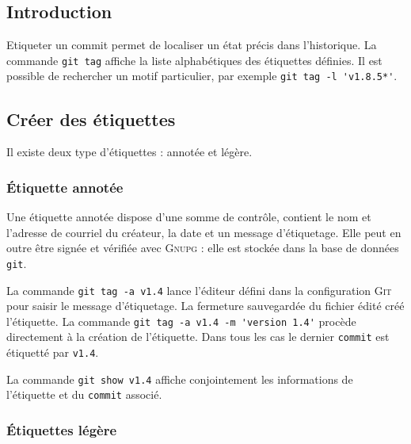 \documentclass[11pt,twoside,headings=normal,open=right,french,DIV=12]{scrreprt}
\newcommand{\git}{\textsc{Git}}
\newcommand{\spec}[1]{\texttt{#1}}
\begin{document}
\subsection{Introduction}



    Etiqueter un commit permet de localiser un état précis dans l'historique. La commande \verb|git tag| affiche la liste
    alphabétiques des étiquettes définies. Il est possible de rechercher un motif particulier, par exemple
    \verb|git tag -l 'v1.8.5*'|.



\subsection{Créer des étiquettes}    



    Il existe deux type d'étiquettes : annotée et légère.



\subsubsection{\'Etiquette annotée}



    Une étiquette annotée dispose d'une somme de contrôle, contient le nom et l'adresse de courriel du créateur, la date
    et un message d'étiquetage. Elle peut en outre être signée et vérifiée avec \textsc{Gnupg} : elle est stockée dans
    la base de données \verb|git|.
    
    \smallskip
    
    La commande \verb|git tag -a v1.4| lance l'éditeur défini dans la configuration \git{} pour saisir le message d'étiquetage. La fermeture
    sauvegardée du fichier édité créé l'étiquette. La commande \verb|git tag -a v1.4 -m 'version 1.4'| procède directement
    à la création de l'étiquette. Dans tous les cas le dernier \spec{commit} est étiquetté par \verb|v1.4|.
    
    \smallskip
    
    La commande \verb|git show v1.4| affiche conjointement les informations de l'étiquette et du \spec{commit} associé.



\subsubsection{\'Etiquettes légère}
\end{document}
